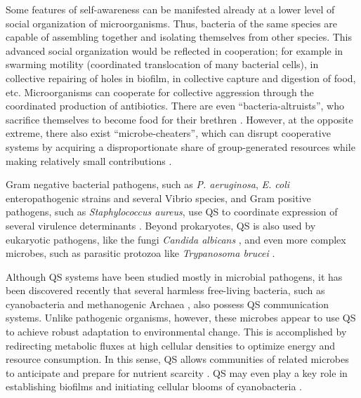 Some features of self-awareness can be manifested already at a lower level of social organization of microorganisms. Thus, bacteria of the same species are capable of assembling together and isolating themselves from other species. This advanced social organization would be reflected in cooperation; for example in swarming motility (coordinated translocation of many bacterial cells), in collective repairing of holes in biofilm, in collective capture and digestion of food, etc. Microorganisms can cooperate for collective aggression through the coordinated production of antibiotics. There are even ``bacteria-altruists'', who sacrifice themselves to become food for their brethren \cite{oleskin_[biosocial_2009}. However, at the opposite extreme, there also exist ``microbe-cheaters'', which can disrupt cooperative systems by acquiring a disproportionate share of group-generated resources while making relatively small contributions \cite{velicer_social_2003}. 

Gram negative bacterial pathogens, such as \textit{P. aeruginosa}, \textit{E. coli} enteropathogenic strains and several Vibrio species, and Gram positive pathogens, such as \textit{Staphylococcus aureus}, use QS to coordinate expression of several virulence determinants \cite{antunes_quorum_2010}. Beyond prokaryotes, QS is also used by eukaryotic pathogens, like the fungi \textit{Candida albicans} \cite{nickerson_quorum_2006}, and even more complex microbes, such as parasitic protozoa like \textit{Trypanosoma brucei} \cite{mony_genome-wide_2014}. 

Although QS systems have been studied mostly in microbial pathogens, it has been discovered recently that several harmless free-living bacteria, such as cyanobacteria \cite{sharif_quorum_2008,zhai_does_2012} and methanogenic Archaea \cite{zhang_acyl_2012}, also possess QS communication systems. Unlike pathogenic organisms, however, these microbes appear to use QS to achieve robust adaptation to environmental change. This is accomplished by redirecting metabolic fluxes at high cellular densities to optimize energy and resource consumption. In this sense, QS allows communities of related microbes to anticipate and prepare for nutrient scarcity \cite{sharif_quorum_2008,zhang_acyl_2012}. QS may even play a key role in establishing biofilms and initiating cellular blooms of cyanobacteria \cite{zhai_does_2012}.

